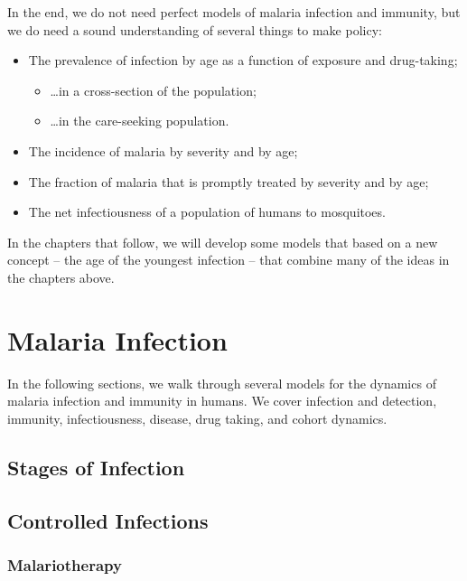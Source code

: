 \documentclass[
]{book}
\begin{document}
In the end, we do not need perfect models of malaria infection and immunity, but we do need a sound understanding of several things to make policy:

\begin{itemize}
\item
  The prevalence of infection by age as a function of exposure and drug-taking;

  \begin{itemize}
  \item
    \ldots in a cross-section of the population;
  \item
    \ldots in the care-seeking population.
  \end{itemize}
\item
  The incidence of malaria by severity and by age;
\item
  The fraction of malaria that is promptly treated by severity and by age;
\item
  The net infectiousness of a population of humans to mosquitoes.
\end{itemize}

In the chapters that follow, we will develop some models that based on a new concept -- the age of the youngest infection -- that combine many of the ideas in the chapters above.

\chapter{Malaria Infection}\label{malaria-infection}

In the following sections, we walk through several models for the dynamics of malaria infection and immunity in humans. We cover infection and detection, immunity, infectiousness, disease, drug taking, and cohort dynamics.

\section{Stages of Infection}\label{stages-of-infection}

\section{Controlled Infections}\label{controlled-infections}

\subsection{Malariotherapy}\label{malariotherapy}
\end{document}
